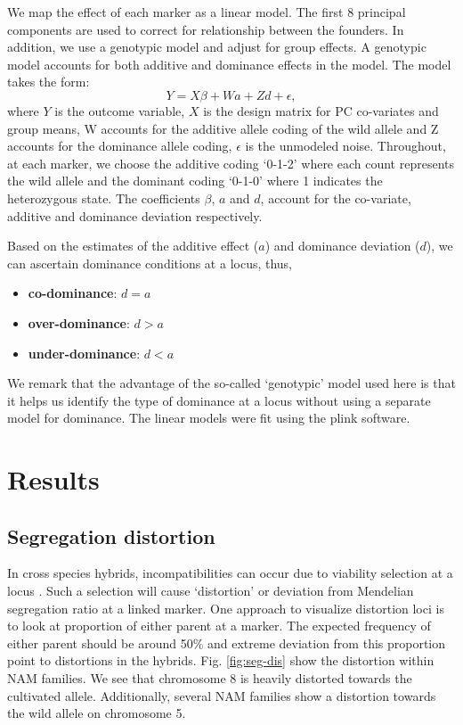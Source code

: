 We map the effect of each marker as a linear model. The first 8 principal components are used to correct for relationship between the founders. In addition, we use a genotypic model and adjust for group effects. A genotypic model accounts for both additive and dominance effects in the model. The model takes the form:
$$Y = X\beta + Wa + Zd + \epsilon,$$
where $Y$ is the outcome variable, $X$ is the design matrix for PC co-variates and group means, W accounts for the additive allele coding of the wild allele and Z accounts for the dominance allele coding, $\epsilon$ is the unmodeled noise. Throughout, at each marker, we choose the additive coding `0-1-2' where each count represents the wild allele and the dominant coding `0-1-0' where 1 indicates the heterozygous state. The coefficients $\beta$, $a$ and $d$, account for the co-variate, additive and dominance deviation respectively. 

Based on the estimates of the additive effect ($a$) and dominance deviation ($d$), we can ascertain dominance conditions at a locus, thus, 
\begin{itemize}
    \item \textbf{co-dominance}: $d = a$
    \item \textbf{over-dominance}: $d > a$
    \item \textbf{under-dominance}: $d < a$
\end{itemize}

We remark that the advantage of the so-called `genotypic' model used here is that it helps us identify the type of dominance at a locus without using a separate model for dominance. The linear models were fit using the plink \cite{Purcell2007} software. 

\section{Results}


\subsection{Segregation distortion}
In  cross species hybrids, incompatibilities can occur due to viability selection at a locus \cite{McMullen2009, Zhan2011}. Such a selection will cause `distortion' or deviation from Mendelian segregation ratio at a linked marker. One approach to visualize distortion loci is to look at proportion of either parent at a marker. The expected frequency of either parent should be around 50\% and extreme deviation from this proportion point to distortions in the hybrids. Fig. \ref{fig:seg-dis} show the distortion within NAM families. We see that chromosome 8 is heavily distorted towards the cultivated allele. Additionally, several NAM families show a distortion towards the wild allele on chromosome 5. 

